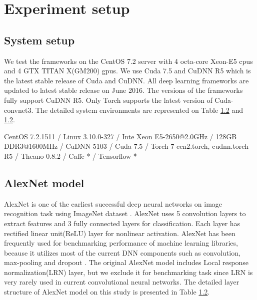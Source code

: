\section{Experiment setup}

\subsection{System setup}
We test the frameworks on the CentOS 7.2 server with 4 octa-core Xeon-E5 cpus and 4 GTX TITAN X(GM200) gpus.
We use Cuda 7.5 and CuDNN R5 which is the latest stable release of Cuda and CuDNN.
All deep learning frameworks are updated to latest stable release on June 2016.
The versions of the frameworks fully support CuDNN R5.
Only Torch supports the latest version of Cuda-convnet3.
The detailed system environments are represented on Table \ref{} and \ref{}.

CentOS 7.2.1511 / Linux 3.10.0-327 / Inte Xeon E5-2650@2.0GHz / 128GB DDR3@1600MHz / CuDNN 5103 / Cuda 7.5 / Torch 7 ccn2.torch, cudnn.torch R5 / Theano 0.8.2 / Caffe * / Tensorflow *

\subsection{AlexNet model}
AlexNet \cite{} is one of the earliest successful deep neural networks on image recognition task using ImageNet dataset \cite{}.
AlexNet uses 5 convolution layers to extract features and 3 fully connected layers for classification.
Each layer has rectified linear unit(ReLU) layer for nonlinear activation.
AlexNet has been frequently used for benchmarking performance of machine learning libraries, because it utilizes most of the current DNN components such as convolution, max-pooling and dropout \cite{}.
The original AlexNet model includes Local response normalization(LRN) layer, but we exclude it for benchmarking task since LRN is very rarely used in current convolutional neural networks.
The detailed layer structure of AlexNet model on this study is presented in Table \ref{}.


